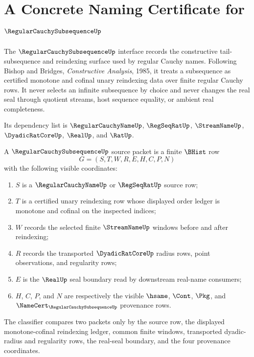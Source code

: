 \chapter{A Concrete Naming Certificate for $\RegularCauchySubsequenceUp$}
\label{ch:concrete-instances-regular-cauchy-subsequence-namecert}

The $\RegularCauchySubsequenceUp$ interface records the constructive tail-subsequence and reindexing surface used by regular Cauchy names. Following Bishop and Bridges, \emph{Constructive Analysis}, 1985, it treats a subsequence as certified monotone and cofinal unary reindexing data over finite regular Cauchy rows. It never selects an infinite subsequence by choice and never changes the real seal through quotient streams, host sequence equality, or ambient real completeness.

Its dependency list is $\RegularCauchyNameUp$, $\RegSeqRatUp$, $\StreamNameUp$, $\DyadicRatCoreUp$, $\RealUp$, and $\RatUp$.

\begin{definition}
\label{def:regular-cauchy-subsequence-carrier}
A $\RegularCauchySubsequenceUp$ source packet is a finite $\BHist$ row
$$
G=(S,T,W,R,E,H,C,P,N)
$$
with the following visible coordinates:
\begin{enumerate}
\item $S$ is a $\RegularCauchyNameUp$ or $\RegSeqRatUp$ source row;
\item $T$ is a certified unary reindexing row whose displayed order ledger is monotone and cofinal on the inspected indices;
\item $W$ records the selected finite $\StreamNameUp$ windows before and after reindexing;
\item $R$ records the transported $\DyadicRatCoreUp$ radius rows, point observations, and regularity rows;
\item $E$ is the $\RealUp$ seal boundary read by downstream real-name consumers;
\item $H$, $C$, $P$, and $N$ are respectively the visible $\hsame$, $\Cont$, $\Pkg$, and $\NameCert_{\RegularCauchySubsequenceUp}$ provenance rows.
\end{enumerate}
The classifier compares two packets only by the source row, the displayed monotone-cofinal reindexing ledger, common finite windows, transported dyadic-radius and regularity rows, the real-seal boundary, and the four provenance coordinates.
\end{definition}

